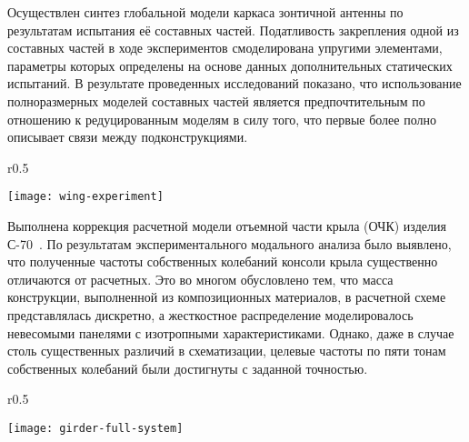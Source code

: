 Осуществлен синтез глобальной модели каркаса зонтичной антенны по результатам испытания её составных частей. Податливость закрепления одной из составных частей в ходе экспериментов смоделирована упругими элементами, параметры которых определены на основе данных дополнительных статических испытаний. В результате проведенных исследований показано, что использование полноразмерных моделей составных частей является предпочтительным по отношению к редуцированным моделям в силу того, что первые более полно описывает связи между подконструкциями. 

\begin{wrapfigure}[14]{r}{0.5\textwidth}
	\begin{center}
		\vspace{-3em}
		\texttt{[image: wing-experiment]} 
		 \label{fig:wing-experiment}
	\end{center}
\end{wrapfigure}

Выполнена коррекция расчетной модели отъемной части крыла (ОЧК) изделия \mbox{С-70}~. По результатам экспериментального модального анализа было выявлено, что полученные частоты собственных колебаний консоли крыла существенно отличаются от расчетных. Это во многом обусловлено тем, что масса конструкции, выполненной из композиционных материалов, в расчетной схеме представлялась дискретно, а жесткостное распределение моделировалось невесомыми панелями с изотропными характеристиками. \mbox{Однако}, даже в случае столь существенных различий в схематизации, целевые частоты по пяти тонам собственных колебаний были достигнуты с заданной точностью. 

\begin{wrapfigure}[13]{r}{0.5\textwidth}
	\begin{center}
		\vspace{-1.25em}
		\texttt{[image: girder-full-system]} 
		 \label{fig:girder-experiment}
	\end{center}
\end{wrapfigure}

